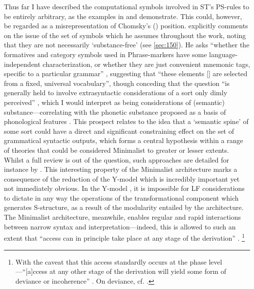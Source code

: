 Thus far I have described the computational symbols involved in ST's PS-rules to be entirely arbitrary, as the examples in  and  demonstrate. This could, however, be regarded as a misrepresentation of Chomsky's (\citeyear{ChomskyN_1965}) position. \textcite{ChomskyN_1965} explicitly comments on the issue of the set of symbols which he assumes throughout the work, noting that they are not necessarily `substance-free' (see \autoref{sec:150}). He asks ``whether the formatives and category symbols used in Phrase-markers have some language-independent characterization, or whether they are just convenient mnemonic tags, specific to a particular grammar'' \parencite[65]{ChomskyN_1965}, suggesting that ``these elements [] are selected from a fixed, universal vocabulary'', though conceding that the question ``is generally held to involve extrasyntactic considerations of a sort only dimly perceived'' \parencite[66]{ChomskyN_1965}, which I would interpret as being considerations of (semantic) substance---correlating with the phonetic substance proposed as a basis of phonological features \parencite{ChomskyN.HalleM_1968}. This prospect relates to the idea that a `semantic spine' of some sort could have a direct and significant constraining effect on the set of grammatical syntactic outputs, which forms a central hypothesis within a range of theories that could be considered Minimalist to greater or lesser extents. Whilst a full review is out of the question, such approaches are detailed for instance by \textcite{WiltschkoM_2014,AdgerD_2013,StarkeM_2004,BrodyM_2000}. This interesting property of the Minimalist architecture  marks a consequence of the reduction of the Y-model which is incredibly important yet not immediately obvious. In the Y-model , it is impossible for LF considerations to dictate in any way the operations of the transformational component which generates S-structure, as a result of the modularity entailed by the architecture. The Minimalist architecture, meanwhile, enables regular and rapid interactions between narrow syntax and interpretation---indeed, this is allowed to such an extent that ``access can in principle take place at any stage of the derivation'' \textcite[7]{ChomskyN_2021}.%
\footnote{With the caveat that this access standardly occurs at the phase level---``[a]ccess at any other stage of the derivation will yield some form of deviance or incoherence'' \textcite[23]{ChomskyN_2021}. On deviance, cf. \textcite{ChomskyN.etal_2019,ChomskyN_2020}.}
